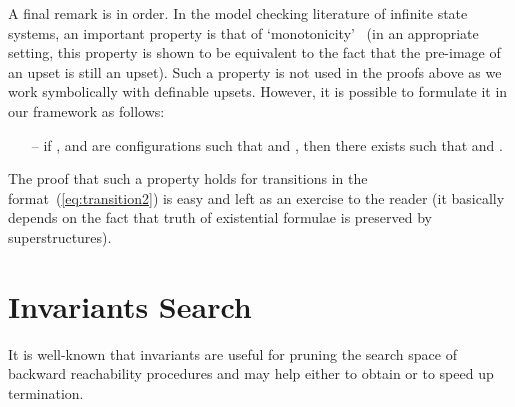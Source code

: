 \documentclass{LMCS}
\theoremstyle{plain}\newtheorem{assumption}[thm]{Assumption}
\theoremstyle{plain}\newtheorem{proposition}[thm]{Proposition}
\theoremstyle{plain}\newtheorem{property}[thm]{Property}
\theoremstyle{plain}\newtheorem{example}[thm]{Example}
\theoremstyle{plain}\newtheorem{claim}[thm]{Claim}
\theoremstyle{plain}\newtheorem{lemma}[thm]{Lemma}
\begin{document}
\noindent A final remark is in order.  In the model checking literature of
infinite state systems, an important property is that of
`monotonicity'~\cite{lics}
(in an appropriate setting, this property is shown to be equivalent to
the fact that the pre-image of an upset is still an upset).  Such a
property is not used in the proofs above as we work symbolically with
definable upsets.  However, it is possible to formulate it in our
framework as follows:
\begin{itemize}
\item[--] if , and  are configurations
  such that  and , then there exists
   such that  and .
\end{itemize}
The proof that such a property holds for transitions in the
format~(\ref{eq:transition2}) is easy and left as an exercise to the
reader (it basically depends on the fact that truth of existential
formulae is preserved by superstructures).



\section{Invariants Search}
\label{sec:inv}

It is well-known that invariants are useful for pruning the search
space of backward reachability procedures and may help either to
obtain or to speed up termination.
\end{document}
